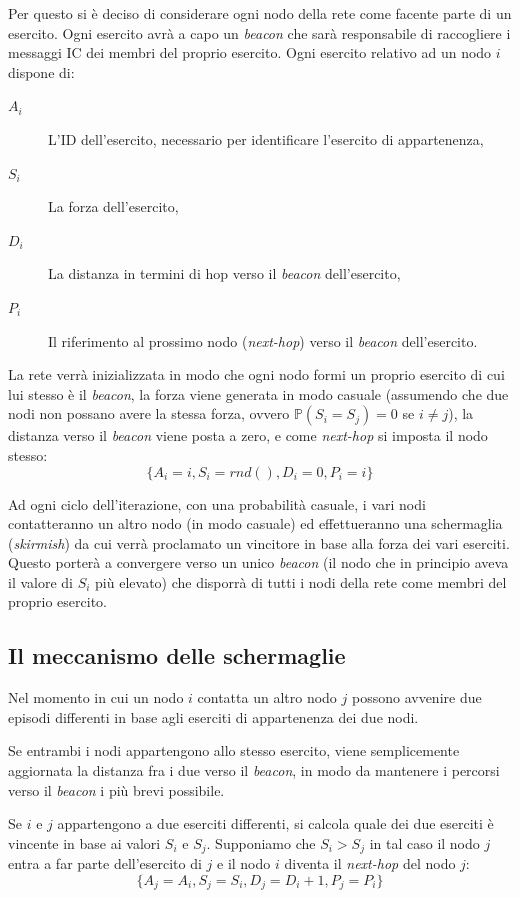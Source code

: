 \documentclass[a4paper,12pt]{article}
\begin{document}
Per questo si \`e deciso di considerare ogni nodo della rete come facente parte di un esercito. Ogni esercito avr\`a a capo un \emph{beacon} che sar\`a responsabile di raccogliere i messaggi IC dei membri del proprio esercito. Ogni esercito relativo ad un nodo $i$ dispone di:
\begin{description}
\item[$A_i$] L'ID dell'esercito, necessario per identificare l'esercito di appartenenza,
\item[$S_i$] La forza dell'esercito,
\item[$D_i$] La distanza in termini di hop verso il \emph{beacon} dell'esercito,
\item[$P_i$] Il riferimento al prossimo nodo (\emph{next-hop}) verso il \emph{beacon} dell'esercito.
\end{description}

La rete verr\`a inizializzata in modo che ogni nodo formi un proprio esercito di cui lui stesso \`e il \emph{beacon}, la forza viene generata in modo casuale (assumendo che due nodi non possano avere la stessa forza, ovvero $\mathbb{P}(S_i = S_j) = 0$ se $i \neq j$), la distanza verso il \emph{beacon} viene posta a zero, e come \emph{next-hop} si imposta il nodo stesso:
$$ \{ A_i = i , S_i = rnd(), D_i = 0, P_i = i \} $$

Ad ogni ciclo dell'iterazione, con una probabilit\`a casuale, i vari nodi contatteranno un altro nodo (in modo casuale) ed effettueranno una schermaglia (\emph{skirmish}) da cui verr\`a proclamato un vincitore in base alla forza dei vari eserciti. Questo porter\`a a convergere verso un unico \emph{beacon} (il nodo che in principio aveva il valore di $S_i$ pi\`u elevato) che disporr\`a di tutti i nodi della rete come membri del proprio esercito.

\subsection{Il meccanismo delle schermaglie}
\label{sec:skirmish}

Nel momento in cui un nodo $i$ contatta un altro nodo $j$ possono avvenire due episodi differenti in base agli eserciti di appartenenza dei due nodi.

Se entrambi i nodi appartengono allo stesso esercito, viene semplicemente aggiornata la distanza fra i due verso il \emph{beacon}, in modo da mantenere i percorsi verso il \emph{beacon} i pi\`u brevi possibile.


Se $i$ e $j$ appartengono a due eserciti differenti, si calcola quale dei due eserciti \`e vincente in base ai valori $S_i$ e $S_j$. Supponiamo che $S_i > S_j$ in tal caso il nodo $j$ entra a far parte dell'esercito di $j$ e il nodo $i$ diventa il \emph{next-hop} del nodo $j$:
$$ \{ A_j = A_i , S_j = S_i, D_j = D_i + 1, P_j = P_i \} $$
\end{document}

